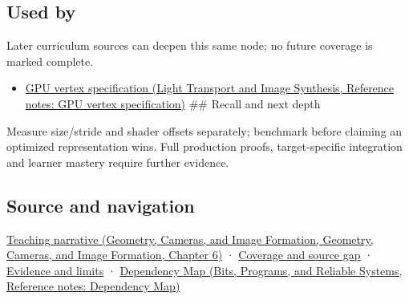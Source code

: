 \subsection{Used by}\label{appendix-26bf6bf2fb8b-used-by}

Later curriculum sources can deepen this same node; no future coverage is marked complete.

\begin{itemize}
\tightlist
\item
  \href{../04-Light-Transport-and-Image-Synthesis/main.pdf\#nameddest=appendix-749ba51a6c25}{GPU vertex specification (Light Transport and Image Synthesis, Reference notes: GPU vertex specification)} \#\# Recall and next depth
\end{itemize}

Measure size/stride and shader offsets separately; benchmark before claiming an optimized representation wins. Full production proofs, target-specific integration and learner mastery require further evidence.

\subsection{Source and navigation}\label{appendix-26bf6bf2fb8b-source-and-navigation}

\href{../03-Geometry-Cameras-and-Image-Formation/main.pdf\#nameddest=02-foundations-ii-ch037-storage-and-computation-can-choose-different-layouts}{Teaching narrative (Geometry, Cameras, and Image Formation, Geometry, Cameras, and Image Formation, Chapter 6)} · \hyperref[appendix-fd090d982a15-phase-6---parts-501-600]{Coverage and source gap} · \hyperref[appendix-a103e7846d21-phase-6---source-analysis-and-verification]{Evidence and limits} · \href{../01-Bits-Programs-and-Reliable-Systems/main.pdf\#nameddest=appendix-4ad47bdd269a}{Dependency Map (Bits, Programs, and Reliable Systems, Reference notes: Dependency Map)}
